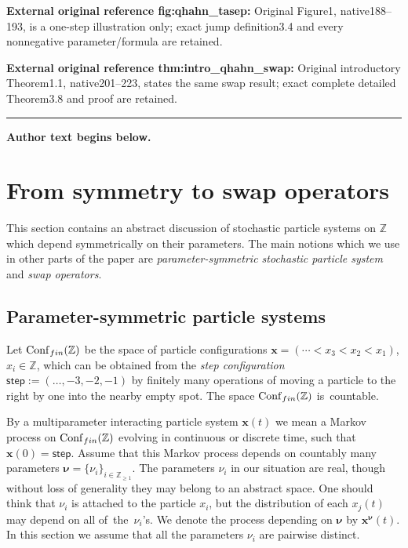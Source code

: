 \documentclass[11pt]{article}
\numberwithin{equation}{section}
\numberwithin{equation}{section}
\begin{document}
\noindent\textbf{External original reference fig:qhahn\_tasep:} Original Figure1, native188–193, is a one-step illustration only; exact jump definition3.4 and every nonnegative parameter/formula are retained.\par
\noindent\textbf{External original reference thm:intro\_qhahn\_swap:} Original introductory Theorem1.1, native201–223, states the same swap result; exact complete detailed Theorem3.8 and proof are retained.\par
\medskip\hrule\medskip\noindent\textbf{Author text begins below.}\par
\setcounter{section}{1}
\section{From symmetry to swap operators}
\label{sec:general_formalism}

This section contains an abstract discussion of
stochastic particle systems on $\mathbb{Z}$ which
depend symmetrically on their parameters.
The main notions which we use in other parts of the
paper are \emph{parameter-symmetric stochastic particle system}
and \emph{swap operators}.

\subsection{Parameter-symmetric particle systems}

Let $\mathrm{Conf}_{\rm fin}(\mathbb{Z})$ be the space of
particle configurations $\mathbf{x}=(\cdots <x_3<x_2<x_1)$,
$x_i\in \mathbb{Z}$,
which can be obtained from the \emph{step configuration}
$\mathsf{step}:=(\ldots,-3,-2,-1 )$
by finitely many operations of moving a particle to the right by one
into the nearby empty spot. The space
$\mathrm{Conf}_{\rm fin}(\mathbb{Z})$ is~countable.

By a multiparameter interacting particle system $\mathbf{x}(t)$
we mean a Markov process on $\mathrm{Conf}_{\rm fin}(\mathbb{Z})$ evolving in continuous
or discrete time,
such that $\mathbf{x}(0)=\mathsf{step}$.
Assume that this Markov process depends on countably many parameters
${\boldsymbol \nu}=\{\nu_i\}_{i\in \mathbb{Z}_{\ge1}}$.
The parameters $\nu_i$ in our situation are real, though without loss of generality
they may belong to an abstract space.
One should think that $\nu_i$ is attached to the particle $x_i$, but the distribution
of each $x_j(t)$ may depend on all of~the~$\nu_i$'s.
We denote the process depending on ${\boldsymbol \nu}$ by $\mathbf{x}^{{\boldsymbol \nu}}(t)$.
In this section we assume that all the parameters $\nu_i$ are pairwise distinct.
\end{document}

